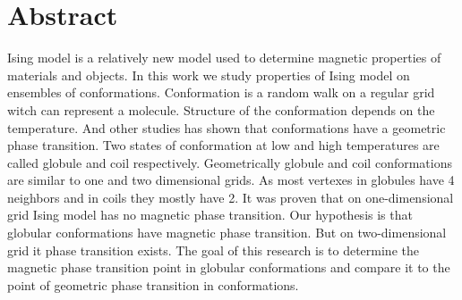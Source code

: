 \section*{Abstract}
Ising model is a relatively new model used to determine magnetic properties of materials and objects. In this work we study properties of Ising model on ensembles of conformations. Conformation is a random walk on a regular grid witch can represent a molecule. Structure of the conformation depends on the temperature. And other studies has shown that conformations have a geometric phase transition. Two states of conformation at low and high temperatures are called globule and coil respectively. Geometrically globule and coil conformations are similar to one and two dimensional grids. As most vertexes in globules have 4 neighbors and in coils they mostly have 2. It was proven that on one-dimensional grid Ising model has no magnetic phase transition. Our hypothesis is that globular conformations have magnetic phase transition. But on two-dimensional grid it phase transition exists. The goal of this research is to determine the magnetic phase transition point in globular conformations and compare it to the point of geometric phase transition in conformations.